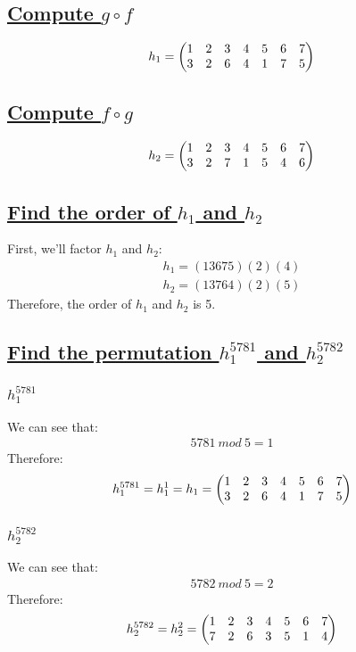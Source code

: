 \documentclass[a4paper, 12pt]{article}
\newcommand{\sub}[1]{\subsection{\underline{#1}}}
\newcommand{\subsub}[1]{\subsubsection{\underline{#1}}}
\newcommand{\eq}[1]{\begin{align*}#1\end{align*}}
\begin{document}
\section{}
\sub{Compute $g\circ{f}$}
\eq{
    h_1=\bigg{(}
    \begin{matrix}
        1&2&3&4&5&6&7\\
        3&2&6&4&1&7&5
    \end{matrix}
    \bigg{)}
}
\sub{Compute $f\circ{g}$}
\eq{
    h_2=\bigg{(}
    \begin{matrix}
        1&2&3&4&5&6&7\\
        3&2&7&1&5&4&6
    \end{matrix}
    \bigg{)}
}
\sub{Find the order of $h_1$ and $h_2$}
First, we'll factor $h_1$ and $h_2$:
\eq{
    h_1=(13675)(2)(4)\\
    h_2=(13764)(2)(5)
}
Therefore, the order of $h_1$ and $h_2$ is 5.
\sub{Find the permutation $h_1^{5781}$ and $h_2^{5782}$}
\subsub{$h_1^{5781}$}
We can see that: \eq{5781~mod~5=1}
Therefore: \eq{
    h_1^{5781}=h_1^1=h_1=\bigg{(}
    \begin{matrix}
        1&2&3&4&5&6&7\\
        3&2&6&4&1&7&5
    \end{matrix}
    \bigg{)}
}
\subsub{$h_2^{5782}$}
We can see that: \eq{5782~mod~5=2}
Therefore: \eq{
    h_2^{5782}=h_2^2=\bigg{(}
    \begin{matrix}
        1&2&3&4&5&6&7\\
        7&2&6&3&5&1&4
    \end{matrix}
    \bigg{)}
}
\end{document}

